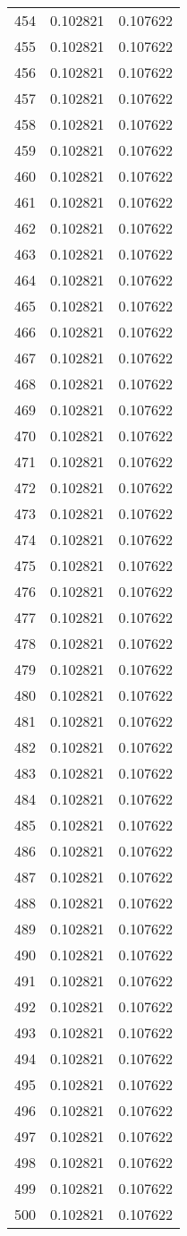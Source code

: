\begin{longtable}{rrr}
454 & 0.102821 & 0.107622 \\
455 & 0.102821 & 0.107622 \\
456 & 0.102821 & 0.107622 \\
457 & 0.102821 & 0.107622 \\
458 & 0.102821 & 0.107622 \\
459 & 0.102821 & 0.107622 \\
460 & 0.102821 & 0.107622 \\
461 & 0.102821 & 0.107622 \\
462 & 0.102821 & 0.107622 \\
463 & 0.102821 & 0.107622 \\
464 & 0.102821 & 0.107622 \\
465 & 0.102821 & 0.107622 \\
466 & 0.102821 & 0.107622 \\
467 & 0.102821 & 0.107622 \\
468 & 0.102821 & 0.107622 \\
469 & 0.102821 & 0.107622 \\
470 & 0.102821 & 0.107622 \\
471 & 0.102821 & 0.107622 \\
472 & 0.102821 & 0.107622 \\
473 & 0.102821 & 0.107622 \\
474 & 0.102821 & 0.107622 \\
475 & 0.102821 & 0.107622 \\
476 & 0.102821 & 0.107622 \\
477 & 0.102821 & 0.107622 \\
478 & 0.102821 & 0.107622 \\
479 & 0.102821 & 0.107622 \\
480 & 0.102821 & 0.107622 \\
481 & 0.102821 & 0.107622 \\
482 & 0.102821 & 0.107622 \\
483 & 0.102821 & 0.107622 \\
484 & 0.102821 & 0.107622 \\
485 & 0.102821 & 0.107622 \\
486 & 0.102821 & 0.107622 \\
487 & 0.102821 & 0.107622 \\
488 & 0.102821 & 0.107622 \\
489 & 0.102821 & 0.107622 \\
490 & 0.102821 & 0.107622 \\
491 & 0.102821 & 0.107622 \\
492 & 0.102821 & 0.107622 \\
493 & 0.102821 & 0.107622 \\
494 & 0.102821 & 0.107622 \\
495 & 0.102821 & 0.107622 \\
496 & 0.102821 & 0.107622 \\
497 & 0.102821 & 0.107622 \\
498 & 0.102821 & 0.107622 \\
499 & 0.102821 & 0.107622 \\
500 & 0.102821 & 0.107622 \\
\end{longtable}
